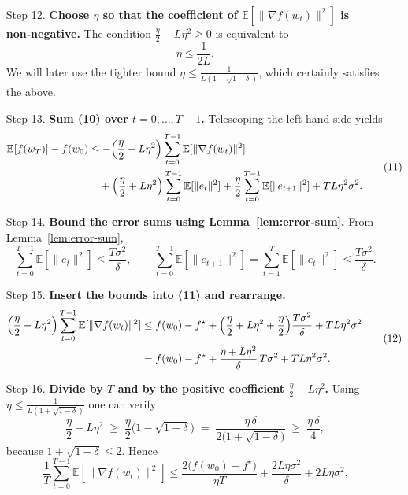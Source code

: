 \documentclass{article}
\newcommand{\E}{\mathbb{E}}
\begin{document}
\begin{enumerate}
\item[Step 12.] \textbf{Choose $\eta$ so that the coefficient of $\E[\|\nabla f(w_{t})\|^{2}]$ is non‑negative.}  
The condition $\frac{\eta}{2}-L\eta^{2}\ge 0$ is equivalent to
\[
    \eta\le \frac{1}{2L}.
\]
We will later use the tighter bound $\eta\le \frac{1}{L(1+\sqrt{1-\delta})}$, which certainly satisfies the above.

\item[Step 13.] \textbf{Sum (10) over $t=0,\dots,T-1$.}  
Telescoping the left‑hand side yields
\[
\begin{aligned}
    \E[f(w_{T})]-f(w_{0})
    &\le -\Bigl(\frac{\eta}{2}-L\eta^{2}\Bigr)
        \sum_{t=0}^{T-1}\E[\|\nabla f(w_{t})\|^{2}]\\
    &\quad +\Bigl(\frac{\eta}{2}+L\eta^{2}\Bigr)
        \sum_{t=0}^{T-1}\E[\|e_{t}\|^{2}]
        +\frac{\eta}{2}\sum_{t=0}^{T-1}\E[\|e_{t+1}\|^{2}]
        +TL\eta^{2}\sigma^{2}.
\end{aligned}
\tag{11}
\]

\item[Step 14.] \textbf{Bound the error sums using Lemma~\ref{lem:error-sum}.}  
From Lemma~\ref{lem:error-sum},
\[
    \sum_{t=0}^{T-1}\E[\|e_{t}\|^{2}]\le \frac{T\sigma^{2}}{\delta},
    \qquad
    \sum_{t=0}^{T-1}\E[\|e_{t+1}\|^{2}]
    =\sum_{t=1}^{T}\E[\|e_{t}\|^{2}]
    \le \frac{T\sigma^{2}}{\delta}.
\]

\item[Step 15.] \textbf{Insert the bounds into (11) and rearrange.}
\[
\begin{aligned}
    \Bigl(\frac{\eta}{2}-L\eta^{2}\Bigr)
        \sum_{t=0}^{T-1}\E[\|\nabla f(w_{t})\|^{2}]
    &\le f(w_{0})-f^{\star}
        +\Bigl(\frac{\eta}{2}+L\eta^{2}+\frac{\eta}{2}\Bigr)
            \frac{T\sigma^{2}}{\delta}
        +TL\eta^{2}\sigma^{2}\\
    &= f(w_{0})-f^{\star}
        +\frac{\eta+L\eta^{2}}{\delta}\,T\sigma^{2}
        +TL\eta^{2}\sigma^{2}.
\end{aligned}
\tag{12}
\]

\item[Step 16.] \textbf{Divide by $T$ and by the positive coefficient $\frac{\eta}{2}-L\eta^{2}$.}
Using $\eta\le \frac{1}{L(1+\sqrt{1-\delta})}$ one can verify
\[
    \frac{\eta}{2}-L\eta^{2}
    \;\ge\; \frac{\eta}{2}\bigl(1-\sqrt{1-\delta}\bigr)
    \;=\; \frac{\eta\,\delta}{2\bigl(1+\sqrt{1-\delta}\bigr)}
    \;\ge\; \frac{\eta\,\delta}{4},
\]
because $1+\sqrt{1-\delta}\le 2$.  Hence
\[
    \frac{1}{T}\sum_{t=0}^{T-1}\E[\|\nabla f(w_{t})\|^{2}]
    \le
    \frac{2\bigl(f(w_{0})-f^{\star}\bigr)}{\eta T}
    +\frac{2L\eta\sigma^{2}}{\delta}
    +2L\eta\sigma^{2}.
\tag{13}
\]


\end{enumerate}
\end{document}
